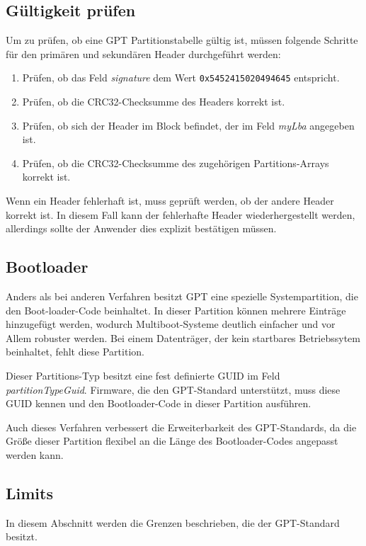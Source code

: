 \subsection{Gültigkeit prüfen}
Um zu prüfen, ob eine GPT Partitionstabelle gültig ist, müssen folgende Schritte für den primären und sekundären Header durchgeführt werden:

\newpage
\begin{enumerate}
    \item Prüfen, ob das Feld \textit{signature} dem Wert \texttt{0x5452415020494645} entspricht.
    \item Prüfen, ob die CRC32-Checksumme des Headers korrekt ist.
    \item Prüfen, ob sich der Header im Block befindet, der im Feld \textit{myLba} angegeben ist.
    \item Prüfen, ob die CRC32-Checksumme des zugehörigen Partitions-Arrays korrekt ist.
\end{enumerate}

Wenn ein Header fehlerhaft ist, muss geprüft werden, ob der andere Header korrekt ist.
In diesem Fall kann der fehlerhafte Header wiederhergestellt werden, allerdings sollte der Anwender dies explizit bestätigen müssen.\cite{uefi-spec}

\subsection{Bootloader}
\label{sec:gpt:bootloader}

Anders als bei anderen Verfahren besitzt GPT eine spezielle Systempartition, die den Boot-loader-Code beinhaltet.
In dieser Partition können mehrere Einträge hinzugefügt werden, wodurch Multiboot-Systeme deutlich einfacher und vor Allem robuster werden.\cite{heise-mbr-gpt}
Bei einem Datenträger, der kein startbares Betriebssytem beinhaltet, fehlt diese Partition.

Dieser Partitions-Typ besitzt eine fest definierte GUID im Feld \textit{partitionTypeGuid}.
Firmware, die den GPT-Standard unterstützt, muss diese GUID kennen und den Bootloader-Code in dieser Partition ausführen.

Auch dieses Verfahren verbessert die Erweiterbarkeit des GPT-Standards, da die Größe dieser Partition flexibel an die Länge des Bootloader-Codes angepasst werden kann.


\subsection{Limits}
In diesem Abschnitt werden die Grenzen beschrieben, die der GPT-Standard besitzt.

